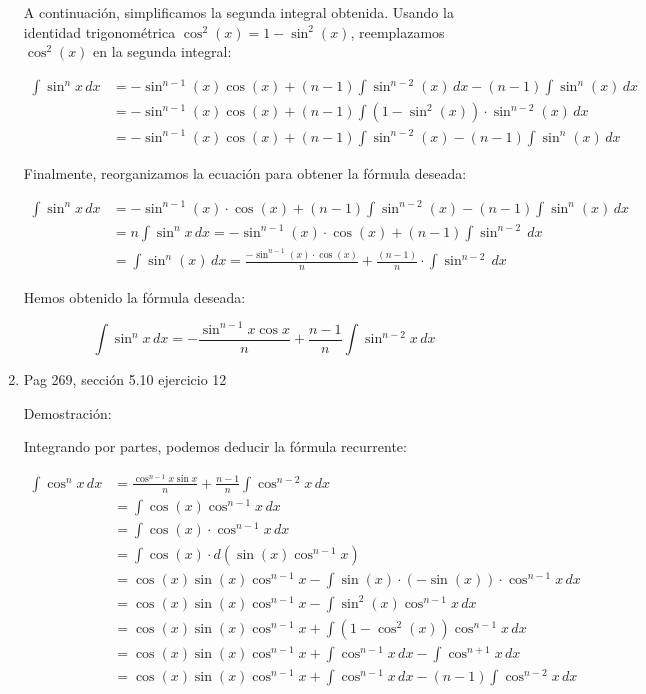 \documentclass{report}
\begin{document}
\begin{enumerate}
        A continuación, simplificamos la segunda integral obtenida. Usando la identidad trigonométrica $\cos^2(x) = 1-\sin^2(x)$, reemplazamos $\cos^2(x)$ en la segunda integral:
        
        \[
        \begin{aligned}
        \int \sin^n x \, dx & =-\sin^{n-1}(x) \cos(x)+(n-1) \int \sin^{n-2}(x) \, dx-(n-1) \int \sin^n(x) \, dx \\
        & =-\sin^{n-1}(x) \cos(x)+(n-1) \int \left(1-\sin^2(x)\right) \cdot \sin^{n-2}(x) \, dx \\
        & =-\sin^{n-1}(x) \cos(x)+(n-1) \int \sin^{n-2}(x)-(n-1) \int \sin^n(x) \, dx
        \end{aligned}
        \]
        
        Finalmente, reorganizamos la ecuación para obtener la fórmula deseada:
        
        \[
        \begin{aligned}
        \int \sin^n x \, dx & =-\sin^{n-1}(x) \cdot \cos(x)+(n-1) \int \sin^{n-2}(x)-(n-1) \int \sin^n(x) \, dx \\
        & =n \int \sin^n x \, dx=-\sin^{n-1}(x) \cdot \cos(x)+(n-1) \int \sin^{n-2} \, dx \\
        & =\int \sin^n(x) \, dx=\frac{-\sin^{n-1}(x) \cdot \cos(x)}{n} +  \frac{(n-1)}{n} \cdot \int \sin^{n-2} \, dx
        \end{aligned}
        \]
        
        Hemos obtenido la fórmula deseada:
        
        \[
        \int \sin^{n} x \, dx = -\frac{\sin^{n-1} x \cos x}{n} + \frac{n-1}{n} \int \sin^{n-2} x \, dx
        \]
        
        \item Pag 269, sección 5.10 ejercicio 12
        
        Demostración:
        
        Integrando por partes, podemos deducir la fórmula recurrente:
        
        \begin{align*}
        \int \cos^{n} x \, dx &=\frac{\cos^{n-1} x \sin x}{n}+\frac{n-1}{n} \int \cos^{n-2} x \, dx \\
        &= \int \cos(x) \cos^{n-1} x \, dx \\
        &= \int \cos(x) \cdot \cos^{n-1} x \, dx \\
        &= \int \cos(x) \cdot d(\sin(x)\cos^{n-1} x) \\
        &= \cos(x) \sin(x)\cos^{n-1} x - \int \sin(x) \cdot (-\sin(x)) \cdot \cos^{n-1} x \, dx \\
        &= \cos(x) \sin(x)\cos^{n-1} x - \int \sin^2(x) \cos^{n-1} x \, dx \\
        &= \cos(x) \sin(x)\cos^{n-1} x + \int (1-\cos^2(x)) \cos^{n-1} x \, dx \\
        &= \cos(x) \sin(x)\cos^{n-1} x + \int \cos^{n-1} x \, dx - \int \cos^{n+1} x \, dx \\
        &= \cos(x) \sin(x)\cos^{n-1} x + \int \cos^{n-1} x \, dx - (n-1) \int \cos^{n-2} x \, dx
        \end{align*}
        

\end{enumerate}
\end{document}
